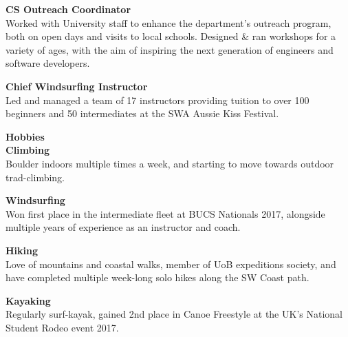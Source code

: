 \documentclass[10pt]{article}
\newcommand{\bold}[1]{\textbf{\textcolor{dark}{#1}}}
\newcommand{\sect}[1]{
\vspace{0.4em} {\LARGE\bold{#1}}\vspace{0.2em}\\}
\newcommand{\xx}[2]{{\large\bold{#1}}\\{#2}\vspace{0.5em}}
\begin{document}
\begin{minipage}[t]{0.34\textwidth}
\xx{CS Outreach Coordinator}
{Worked with University staff to enhance the department's outreach program, both on open days and visits to local schools. 
Designed \& ran workshops for a variety of ages, with the aim of inspiring the next generation of engineers and software developers.}

\xx{Chief Windsurfing Instructor}
{Led and managed a team of 17 instructors providing tuition to over 100 beginners and 50 intermediates at the SWA Aussie Kiss Festival.}





\sect{Hobbies}

\xx{Climbing}
{Boulder indoors multiple times a week, and starting to move towards outdoor trad-climbing.}

\xx{Windsurfing}
{Won first place in the intermediate fleet at BUCS Nationals 2017, alongside multiple years of experience as an instructor and coach.}

\xx{Hiking}
{Love of mountains and coastal walks, member of UoB expeditions society, and have completed multiple week-long solo hikes along the SW Coast path.}

\xx{Kayaking}
{Regularly surf-kayak, gained 2nd place in Canoe Freestyle at the UK's National Student Rodeo event 2017.}

\end{minipage} 
\hfill
%
%
%
%
\end{document}
